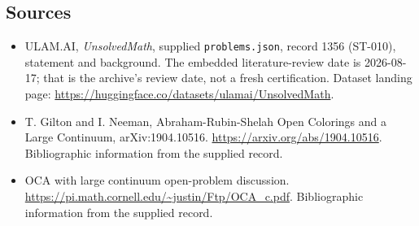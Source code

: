 \documentclass[11pt,a4paper]{article}
\begin{document}
\subsection{Sources}

{\small

\begin{itemize}

\item[\hypertarget{source:1356:1}{S1}] ULAM.AI, \emph{UnsolvedMath}, supplied \texttt{problems.json}, record 1356 (ST-010), statement and background. The embedded literature-review date is 2026-08-17; that is the archive’s review date, not a fresh certification. Dataset landing page: \url{https://huggingface.co/datasets/ulamai/UnsolvedMath}.

\item[\hypertarget{source:1356:2}{S2}] T. Gilton and I. Neeman, Abraham-Rubin-Shelah Open Colorings and a Large Continuum, arXiv:1904.10516. \url{https://arxiv.org/abs/1904.10516}. Bibliographic information from the supplied record.

\item[\hypertarget{source:1356:3}{S3}] OCA with large continuum open-problem discussion. \url{https://pi.math.cornell.edu/~justin/Ftp/OCA_c.pdf}. Bibliographic information from the supplied record.

\end{itemize}

}

\label{end:1356}
\end{document}
